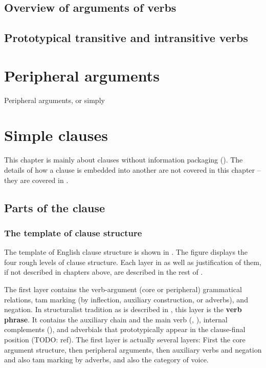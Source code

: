 \documentclass[UTF8, a4paper, oneside, scheme=plain]{ctexrep}
\newcommand*{\concept}[1]{\textbf{#1}}
\begin{document}
\section{Overview of arguments of verbs}\label{sec:valency.overview}

\section{Prototypical transitive and intransitive verbs}



\chapter{Peripheral arguments}\label{chap:peripheral-arguments}

Peripheral arguments, or simply 

\chapter{Simple clauses}\label{chap:simple-clause}

This chapter is mainly about clauses 
without information packaging ().
The details of how a clause is embedded into another are not covered in this chapter
-- they are covered in .

\section{Parts of the clause}\label{sec:simple-clause.overview}

\subsection{The template of clause structure}\label{sec:clause-template}

The template of English clause structure is shown in .
The figure displays the four rough levels of clause structure.
Each layer in  as well as justification of them,
if not described in chapters above, are described 
in the rest of .

The first layer contains the verb-argument (core or peripheral) grammatical relations,
\ac{tam} marking (by inflection, auxiliary construction, or adverbs), and negation.
In structuralist tradition as is described in \citet{cgel},
this layer is the \concept{verb phrase}.
It contains the auxiliary chain and the main verb 
(, ),
internal complements (),
and adverbials that prototypically appear in the clause-final position (TODO: ref).
The first layer is actually several layers:
First the core argument structure,
then peripheral arguments, 
then auxiliary verbs and negation and also \acs{tam} marking by adverbs,
and also the category of voice. 
\end{document}
